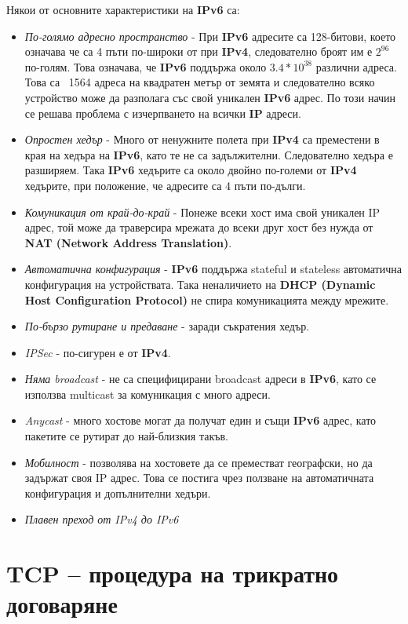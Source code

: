 \documentclass[fleqn,12pt]{article}
\begin{document}
Някои от основните характеристики на \textbf{IPv6} са:
\begin{itemize}
    \item \textit{По-голямо адресно пространство} - При \textbf{IPv6} адресите са 128-битови, което означава че са 4 пъти по-широки от при \textbf{IPv4}, 
    следователно броят им е $2^{96}$ по-голям.
    Това означава, че \textbf{IPv6} поддържа около $3.4 * 10^{38}$ различни адреса.
    Това са ~1564 адреса на квадратен метър от земята и следователно всяко устройство може да разполага със свой уникален \textbf{IPv6} адрес.
    По този начин се решава проблема с изчерпването на всички \textbf{IP} адреси.
    \item \textit{Опростен хедър} - Много от ненужните полета при \textbf{IPv4} са преместени в края на хедъра на \textbf{IPv6}, като те не са задължителни.
    Следователно хедъра е разширяем.
    Така \textbf{IPv6} хедърите са около двойно по-големи от \textbf{IPv4} хедърите, при положение, че адресите са 4 пъти по-дълги.
    \item \textit{Комуникация от край-до-край} - Понеже всеки хост има свой уникален IP адрес, той може да траверсира мрежата до всеки друг хост без нужда от \textbf{NAT (Network Address Translation)}.
    \item \textit{Автоматична конфигурация} - \textbf{IPv6} поддържа stateful и stateless автоматична конфигурация на устройствата.
    Така неналичието на \textbf{DHCP (Dynamic Host Configuration Protocol)} не спира комуникацията между мрежите.
    \item \textit{По-бързо рутиране и предаване} - заради съкратения хедър.
    \item \textit{IPSec} - по-сигурен е от \textbf{IPv4}.
    \item \textit{Няма broadcast} - не са специфицирани broadcast адреси в \textbf{IPv6}, като се използва multicast за комуникация с много адреси.
    \item \textit{Anycast} - много хостове могат да получат един и същи \textbf{IPv6} адрес, като пакетите се рутират до най-близкия такъв.
    \item \textit{Мобилност} - позволява на хостовете да се преместват географски, но да задържат своя IP адрес.
    Това се постига чрез ползване на автоматичната конфигурация и допълнителни хедъри.
    \item \textit{Плавен преход от IPv4 до IPv6}
\end{itemize}

\section{TCP – процедура на трикратно договаряне}
\end{document}
